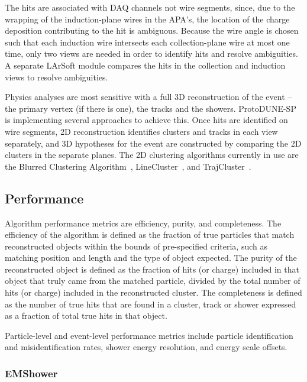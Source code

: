 The hits are associated with DAQ channels 
not wire segments, since, due to the wrapping of the induction-plane
wires in the APA's, the location of the %
charge deposition contributing to the hit is ambiguous. %
Because the wire angle
is chosen such that each induction wire intersects each collection-plane
wire at most one time, only two views are needed in order to identify
hits and resolve ambiguities.  A separate LArSoft module compares the
hits in the collection and induction views to
resolve ambiguities.  

Physics analyses are most sensitive with a full 3D reconstruction of the
event -- the primary vertex (if there is one), the tracks and the showers.
ProtoDUNE-SP is implementing several approaches to achieve this. Once hits are identified on wire
segments, 2D reconstruction identifies clusters and tracks
in each view separately, and 3D hypotheses for
the event are constructed by comparing the 2D clusters
in the separate planes.  The 2D clustering algorithms currently in
use are the Blurred Clustering Algorithm~\cite{blurredclustering},
LineCluster~\cite{linecluster}, and TrajCluster~\cite{trajcluster}.  

\subsection{Performance}

Algorithm performance metrics are efficiency, purity, and completeness.  The
efficiency of the algorithm is defined as the fraction of true particles that
match reconstructed objects within the bounds of pre-specified
criteria, such as matching position and length and the type of object
expected.  The purity of the reconstructed object is defined as the fraction of
hits (or charge) included in that object that truly came from the
matched particle, divided by the total number of hits (or charge)
included in the reconstructed cluster.  The completeness is defined as
the number of true hits that are found in a cluster, track or shower
expressed as a fraction of total true hits in that object.  

Particle-level and event-level performance metrics include particle identification
and misidentification rates, shower energy resolution, and energy scale offsets.


\subsubsection{EMShower}

